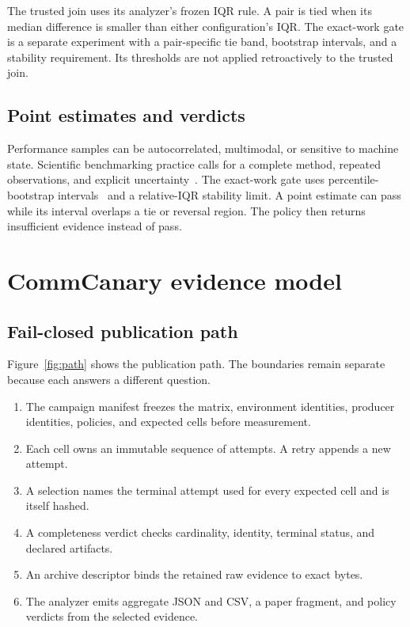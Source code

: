 \documentclass[10pt,twocolumn]{article}
\begin{document}
The trusted join uses its analyzer's frozen IQR rule. A pair is tied when its
median difference is smaller than either configuration's IQR. The exact-work
gate is a separate experiment with a pair-specific tie band, bootstrap
intervals, and a stability requirement. Its thresholds are not applied
retroactively to the trusted join.

\subsection{Point estimates and verdicts}

Performance samples can be autocorrelated, multimodal, or sensitive to machine
state. Scientific benchmarking practice calls for a complete method, repeated
observations, and explicit uncertainty~\cite{benchmarking}. The exact-work gate
uses percentile-bootstrap intervals~\cite{efron} and a relative-IQR stability
limit. A point estimate can pass while its interval overlaps a tie or reversal
region. The policy then returns insufficient evidence instead of pass.

\section{CommCanary evidence model}

\subsection{Fail-closed publication path}

Figure~\ref{fig:path} shows the publication path. The boundaries remain
separate because each answers a different question.

\begin{enumerate}
  \item The campaign manifest freezes the matrix, environment identities,
    producer identities, policies, and expected cells before measurement.
  \item Each cell owns an immutable sequence of attempts. A retry appends a new
    attempt.
  \item A selection names the terminal attempt used for every expected cell
    and is itself hashed.
  \item A completeness verdict checks cardinality, identity, terminal status,
    and declared artifacts.
  \item An archive descriptor binds the retained raw evidence to exact bytes.
  \item The analyzer emits aggregate JSON and CSV, a paper fragment, and policy
    verdicts from the selected evidence.
\end{enumerate}
\end{document}
